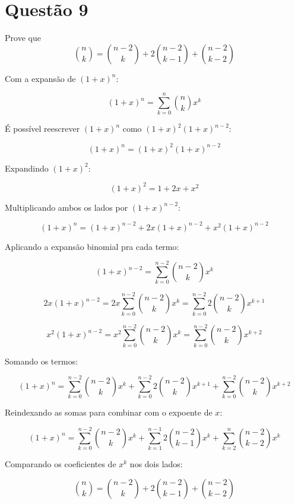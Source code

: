 \section*{Questão 9}
Prove que \[\binom{n}{k} = \binom{n-2}{k} + 2\binom{n-2}{k-1} + \binom{n-2}{k-2}
\]

\vspace{10pt}

Com a expansão de \((1 + x)^n\):

\[
(1 + x)^n = \sum_{k=0}^{n} \binom{n}{k} x^k
\]

É possível reescrever \((1 + x)^n\) como \((1 + x)^2 (1 + x)^{n-2}\):

\[
(1 + x)^n = (1 + x)^2 (1 + x)^{n-2}
\]
\vspace{10pt}

Expandindo \((1 + x)^2\):

\[
(1 + x)^2 = 1 + 2x + x^2
\]
\vspace{10pt}

Multiplicando ambos os lados por \((1 + x)^{n-2}\):

\[
(1 + x)^n = (1 + x)^{n-2} + 2x(1 + x)^{n-2} + x^2(1 + x)^{n-2}
\]
\vspace{10pt}

Aplicando a expansão binomial pra cada termo:

\[
(1 + x)^{n-2} = \sum_{k=0}^{n-2} \binom{n-2}{k} x^k
\]

\[
2x(1 + x)^{n-2} = 2x \sum_{k=0}^{n-2} \binom{n-2}{k} x^k = \sum_{k=0}^{n-2} 2\binom{n-2}{k} x^{k+1}
\]

\[
x^2(1 + x)^{n-2} = x^2 \sum_{k=0}^{n-2} \binom{n-2}{k} x^k = \sum_{k=0}^{n-2} \binom{n-2}{k} x^{k+2}
\]
\vspace{10pt}

Somando os termos:

\[
(1 + x)^n = \sum_{k=0}^{n-2} \binom{n-2}{k} x^k + \sum_{k=0}^{n-2} 2\binom{n-2}{k} x^{k+1} + \sum_{k=0}^{n-2} \binom{n-2}{k} x^{k+2}
\]
\vspace{10pt}

Reindexando as somas para combinar com o expoente de \(x\):

\[
(1 + x)^n = \sum_{k=0}^{n-2} \binom{n-2}{k} x^k + \sum_{k=1}^{n-1} 2\binom{n-2}{k-1} x^k + \sum_{k=2}^{n} \binom{n-2}{k-2} x^k
\]
\vspace{10pt}

Comparando os coeficientes de \(x^k\) nos dois lados:

\[
\binom{n}{k} = \binom{n-2}{k} + 2\binom{n-2}{k-1} + \binom{n-2}{k-2}
\]

